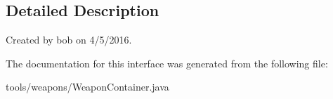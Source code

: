 \subsection{Detailed Description}
Created by bob on 4/5/2016. 

The documentation for this interface was generated from the following file\+:\begin{DoxyCompactItemize}
\item 
tools/weapons/Weapon\+Container.\+java\end{DoxyCompactItemize}
